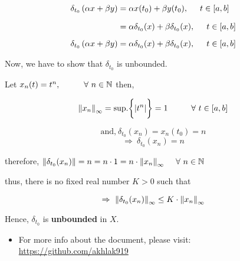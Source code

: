 \documentclass[a4paper,12pt]{article}
\begin{document}
    \begin{equation*}
        \begin{split}
            \delta_{t_0}\left(\alpha x + \beta y\right) & = \alpha x(t_0) + \beta y(t_0), \hspace*{0.5cm} t\in [a,b]\\[2.5mm]
            & = \alpha \delta_{t_0}(x) + \beta \delta_{t_0}(x), \hspace*{0.5cm} t\in [a,b]\\[2mm]
            \delta_{t_0}\left(\alpha x + \beta y\right) & = \alpha \delta_{t_0}(x) + \beta \delta_{t_0}(x), \hspace*{0.5cm} t\in [a,b]
        \end{split}
    \end{equation*}

    Now, we have to show that $\delta_{t_0}$ is unbounded.
    \vspace*{0.3cm}

    Let $x_n(t) = t^n, \hspace*{1cm} \forall\ n\in \mathbb{N}$ then,

    \[\norm{x_n}_\infty =\displaystyle {\mbox{sup.}}\biggl\{|t^n|\biggr\} = 1\hspace*{1cm} \forall\ t\in [a,b]\]

    \[\mbox{and,}\ \delta_{t_0}(x_n) = x_n(t_0) = n\]
    \[\Rightarrow\ \delta_{t_0}(x_n) = n\]

    therefore, $\norm{\delta_{t_0}(x_n)} = n = n\cdot 1 = n\cdot \norm{x_n}_\infty \hspace*{0.5cm} \forall\ n\in \mathbb{N}$ 
    \vspace*{0.3cm}

    thus, there is no fixed real number $K > 0$ such that
    
    \[\Rightarrow\ \norm{\delta_{t_0}(x_n)}_\infty \leq K\cdot \norm{x_n}_\infty\]

    Hence, $\delta_{t_0}$ is {\bf unbounded} in $X$.

    \begin{itemize}
        \item For more info about the document, please visit: \url{https://github.com/akhlak919}
    \end{itemize}
\end{document}
